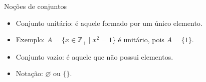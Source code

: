 \documentclass[14pt, aspectratio=169]{beamer}
\newcommand{\Z}{\mathbb{Z}}
\begin{document}
\begin{frame}{Noções de conjuntos}

\begin{itemize}
    \item Conjunto unitário: é aquele formado por um único elemento.  
    
    \item Exemplo: $A = \{ x \in \Z_+ \mid x^2 = 1 \}$ é unitário, pois $A = \{ 1 \}$.

    \vspace{0.75cm}
    
    \item Conjunto vazio: é aquele que não possui elementos.

    \item Notação: $\varnothing$ ou $\{ \}$.
\end{itemize}
    
\end{frame}
\end{document}

